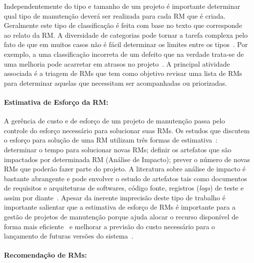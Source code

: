 Independentemente do tipo e tamanho de um projeto é importante determinar qual
tipo de manutenção deverá ser realizada para cada RM que é criada. Geralmente
este tipo de classificação é feita com base no texto que corresponde ao relato
da RM\@. A diversidade de categorias pode tornar a tarefa complexa pelo fato de
que em muitos casos não é fácil determinar os limites entre os
tipos~\cite{antoniol2008bug}. Por exemplo, a uma classificação incorreta de um
defeito que na verdade trata-se de uma melhoria pode acarretar em atrasos no
projeto~\cite{cavalcanti2014challenges}. A principal atividade associada é a
triagem de RMs que tem como objetivo revisar uma lista de RMs para determinar
aquelas que necessitam ser acompanhadas ou priorizadas.

\paragraph{Estimativa de Esforço da RM:}

A gerência de custo e de esforço de um projeto de manutenção passa pelo
controle do esforço necessário para solucionar suas RMs. Os estudos que
discutem o esforço para solução de uma RM utilizam três formas de
estimativa~\cite{cavalcanti2014challenges}: determinar o tempo para solucionar
novas RMs; definir os artefatos que são impactados por determinada RM (Análise
de Impacto); prever o número de novas RMs que poderão fazer parte do projeto. A
literatura sobre análise de impacto é bastante abrangente e pode envolver o
estudo de artefatos tais como documentos de requisitos e arquiteturas de
softwares, código fonte, registros (\textit{logs}) de teste e assim por
diante~\cite{cavalcanti2014challenges}. Apesar da inerente imprecisão deste
tipo de trabalho é importante salientar que a estimativa de esforço de RMs é
importante para a gestão de projetos de manutenção porque ajuda alocar o
recurso disponível de forma mais
eficiente~\cite{Bhattacharya:2011:BTP:1985441.1985472} e melhorar a previsão do
custo necessário para o lançamento de futuras versões do
sistema~\cite{Vijayakumar2014}.

\paragraph{Recomendação de RMs:}

